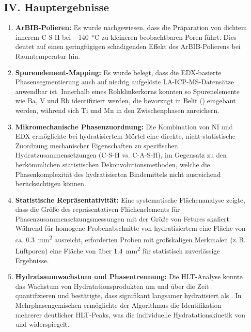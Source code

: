 \documentclass[11pt, a4paper]{article}
\begin{document}
\subsection*{IV. Hauptergebnisse}

\begin{enumerate}[label=\textbf{\arabic*.}, leftmargin=1.5cm, labelsep=0.5cm, itemsep=0.5em, resume]
    \item \textbf{ArBIB-Polieren:} Es wurde nachgewiesen, dass die Präparation von dichtem innerem C-S-H bei \qty{-140}{\celsius} zu kleineren beobachtbaren Poren führt.
    Dies deutet auf einen geringfügigen schädigenden Effekt des ArBIB-Polierens bei Raumtemperatur hin.
    \item \textbf{Spurenelement-Mapping:} Es wurde belegt, dass die EDX-basierte Phasensegmentierung auch auf niedrig aufgelöste LA-ICP-MS-Datensätze anwendbar ist.
    Innerhalb eines Rohklinkerkorns konnten so Spurenelemente wie Ba, V und Rb identifiziert werden, die bevorzugt in Belit () eingebaut werden, während sich Ti und Mn in den Zwischenphasen anreichern.
    \newpage
    \item \textbf{Mikromechanische Phasenzuordnung:} Die Kombination von NI und EDX ermöglichte bei hydratisiertem Mörtel eine direkte, nicht-statistische Zuordnung mechanischer Eigenschaften zu spezifischen Hydratzusammensetzungen (C-S-H vs. C-A-S-H), im Gegensatz zu den herkömmlichen statistischen Dekonvolutionsmethoden, welche die Phasenkomplexität des hydratisierten Bindemittels nicht ausreichend berücksichtigen können.
    \item \textbf{Statistische Repräsentativität:} Eine systematische Flächenanalyse zeigte, dass die Größe des repräsentativen Flächenelements für Phasenzusammensetzungsmessungen mit der Größe von Fetures skaliert. Während für homogene Probenabschnitte von hydratisiertem  eine Fläche von ca. \qty{0,3}{\milli\meter\squared} ausreicht, erforderten Proben mit großskaligen Merkmalen (z.\,B. Luftporen) eine Fläche von über \qty{1,4}{\milli\meter\squared} für statistisch zuverlässige Ergebnisse.
    \item \textbf{Hydratsaumwachstum und Phasentrennung:} Die HLT-Analyse konnte das Wachstum von Hydratationsprodukten um  und  über die Zeit quantifizieren und bestätigte, dass  signifikant langsamer hydratisiert als .
    In Mehrphasengemischen ermöglichte der Algorithmus die Identifikation mehrerer deutlicher HLT-Peaks, was die individuelle Hydratationskinetik von  und  widerspiegelt.

\end{enumerate}
\end{document}
